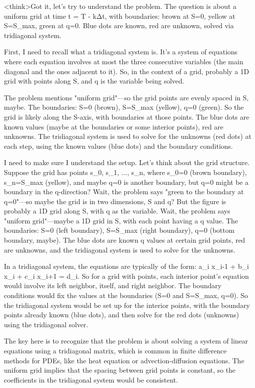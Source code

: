 <think>Got it, let's try to understand the problem. The question is about a uniform grid at time t = T - kΔt, with boundaries: brown at S=0, yellow at S=S_max, green at q=0. Blue dots are known, red are unknown, solved via tridiagonal system. 

First, I need to recall what a tridiagonal system is. It's a system of equations where each equation involves at most the three consecutive variables (the main diagonal and the ones adjacent to it). So, in the context of a grid, probably a 1D grid with points along S, and q is the variable being solved. 

The problem mentions "uniform grid"—so the grid points are evenly spaced in S, maybe. The boundaries: S=0 (brown), S=S_max (yellow), q=0 (green). So the grid is likely along the S-axis, with boundaries at those points. The blue dots are known values (maybe at the boundaries or some interior points), red are unknowns. The tridiagonal system is used to solve for the unknowns (red dots) at each step, using the known values (blue dots) and the boundary conditions.

I need to make sure I understand the setup. Let's think about the grid structure. Suppose the grid has points s_0, s_1, ..., s_n, where s_0=0 (brown boundary), s_n=S_max (yellow), and maybe q=0 is another boundary, but q=0 might be a boundary in the q-direction? Wait, the problem says "green to the boundary at q=0"—so maybe the grid is in two dimensions, S and q? But the figure is probably a 1D grid along S, with q as the variable. Wait, the problem says "uniform grid"—maybe a 1D grid in S, with each point having a q value. The boundaries: S=0 (left boundary), S=S_max (right boundary), q=0 (bottom boundary, maybe). The blue dots are known q values at certain grid points, red are unknowns, and the tridiagonal system is used to solve for the unknowns.

In a tridiagonal system, the equations are typically of the form: a_i x_{i-1} + b_i x_i + c_i x_{i+1} = d_i. So for a grid with points, each interior point's equation would involve its left neighbor, itself, and right neighbor. The boundary conditions would fix the values at the boundaries (S=0 and S=S_max, q=0). So the tridiagonal system would be set up for the interior points, with the boundary points already known (blue dots), and then solve for the red dots (unknowns) using the tridiagonal solver.

The key here is to recognize that the problem is about solving a system of linear equations using a tridiagonal matrix, which is common in finite difference methods for PDEs, like the heat equation or advection-diffusion equations. The uniform grid implies that the spacing between grid points is constant, so the coefficients in the tridiagonal system would be consistent.

